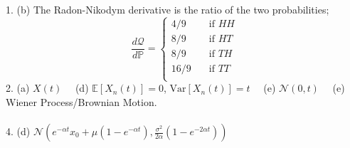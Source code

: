 \documentclass[11pt]{article}
\newcommand{\PR}{\mathbb{P}}
\begin{document}
	1. (b) The Radon-Nikodym derivative is the ratio of the two probabilities;
	\[	\frac{d\mathcal{Q}}{d\PR} = \begin{cases}
										4/9 & \quad \text{if }HH\\
										8/9 & \quad \text{if }HT\\
										8/9 & \quad \text{if }TH\\
										16/9 & \quad \text{if }TT\\
										\end{cases}
			\] 
	2. (a) $X(t)\quad$ (d) $\mathbb{E}[X_{n}(t)] = 0$, $\text{Var}[X_{n}(t)] = t\quad$ (e) $\mathcal{N}(0,t)\quad$ (e) Wiener Process/Brownian Motion.\\\\
	4. (d) $\mathcal{N}\left(e^{-\alpha t}x_{0} + \mu(1 - e^{-\alpha t}), \frac{\sigma^{2}}{2\alpha}(1 - e^{-2\alpha t})\right)$
	
\end{document}
